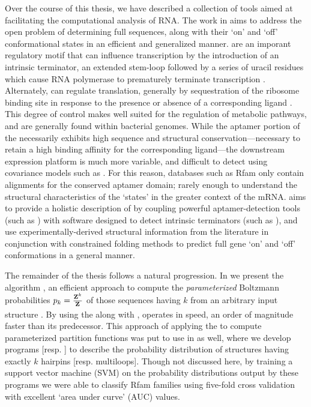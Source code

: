 \documentclass[11pt, oneside]{Thesis} %
\begin{document}
Over the course of this thesis, we have described a collection of tools aimed
at facilitating the computational analysis of RNA. The work in 
aims to address the open problem of determining full \rb sequences, along
with their `on' and `off' conformational states in an efficient and generalized
manner. \Rbs are an imporant regulatory motif that can influence
transcription by the introduction of an intrinsic terminator, an extended stem-loop
followed by a series of uracil residues which cause RNA polymerase to prematurely
terminate transcription \citep{gusarov:1999uu,yarnell:1999wt}. Alternately,
\rbs can regulate translation, generally by sequestration of the ribosome
binding site in response to the presence or absence of a corresponding ligand
\citep{barrick:2007gw}. This degree of control makes \rbs well suited for
the regulation of metabolic pathways, and are generally found within bacterial
genomes. While the aptamer portion of the \rb necessarily exhibits high
sequence and structural conservation---necessary to retain a high binding affinity
for the corresponding ligand---the downstream expression platform is much more
variable, and difficult to detect using covariance models such as \infernal
\citep{infernal}. For this reason, databases such as Rfam \citep{nawrocki:2014uy}
only contain alignments for the conserved aptamer domain; rarely enough to
understand the structural characteristics of the \rb `states' in the greater
context of the mRNA. \rfinder aims to provide a holistic description of
\rbs by coupling powerful aptamer-detection tools (such as \infernal) with software
designed to detect intrinsic terminators (such as \tthp), and use
experimentally-derived structural information from the literature in conjunction
with constrained folding methods to predict full gene `on' and `off' conformations
in a general manner.

The remainder of the thesis follows a natural progression. In  we
present the algorithm \fftbor, an efficient approach to compute the
{\em parameterized} Boltzmann probabilities $p_k = \frac{{\bf Z}^{k}_{}}{{\bf Z}^{}_{}}$ of
those sequences having \bpd $k$ from an arbitrary input structure
\strSt. By using the \fft along with \nRoUs, \fftbor operates in  speed,
an order of magnitude faster than its predecessor. This approach of applying the
\fft to compute parameterized partition functions was put to use in
\citep{ding:2014ex} as well, where we develop programs 
[resp. ] to describe the probability distribution of structures
having exactly $k$ hairpins [resp. multiloops]. Though not discussed here, by
training a support vector machine (SVM) on the probability distributions output
by these
programs we were able to classify Rfam families using five-fold cross validation
with excellent `area under curve' (AUC) values.
\end{document}
